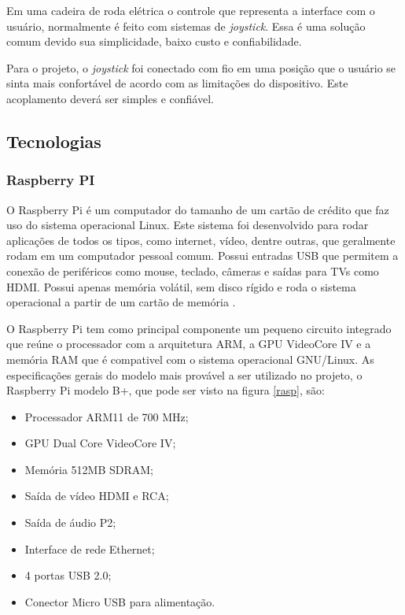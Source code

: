 Em uma cadeira de roda elétrica o controle que representa a interface com o usuário, normalmente é feito com sistemas de \textit{joystick}. Essa é uma solução comum devido sua simplicidade, baixo custo e confiabilidade.

Para o projeto, o \textit{joystick} foi conectado com fio em uma posição que o usuário se sinta mais confortável de acordo com as limitações do dispositivo. Este acoplamento deverá ser simples e confiável.

\subsection{Tecnologias}
\label{subsec:tecnologias}
\subsubsection{Raspberry PI}

O Raspberry Pi é um computador do tamanho de um cartão de crédito que faz uso do sistema operacional Linux. Este sistema foi desenvolvido para rodar aplicações de todos os tipos, como internet, vídeo, dentre outras, que geralmente rodam em um computador pessoal comum. Possui entradas USB que permitem a conexão de periféricos como mouse, teclado, câmeras e saídas para TVs como HDMI. Possui apenas memória volátil, sem disco rígido e roda o sistema operacional a partir de um cartão de memória \cite{rasp_foundation}.

O Raspberry Pi tem como principal componente um pequeno circuito integrado que reúne o processador com a arquitetura ARM, a GPU VideoCore IV e a memória RAM que é compativel com o sistema operacional GNU/Linux. As especificações gerais do modelo mais provável a ser utilizado no projeto, o Raspberry Pi modelo B+, que pode ser visto na figura \ref{rasp}, são:

\begin{itemize}
	\item Processador ARM11 de 700 MHz;
	\item GPU Dual Core VideoCore IV;
	\item Memória 512MB SDRAM;
	\item Saída de vídeo HDMI e RCA;
	\item Saída de áudio P2;
	\item Interface de rede Ethernet;
	\item 4 portas USB 2.0;
	\item Conector Micro USB para alimentação.
\end{itemize}

